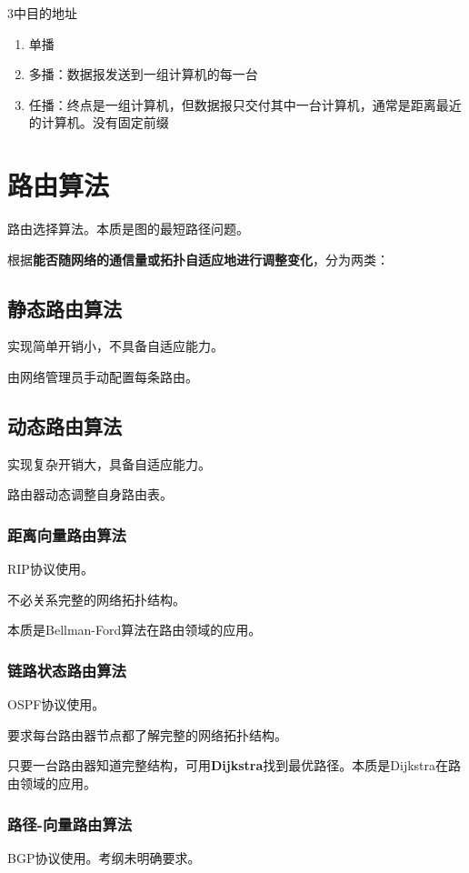 3中目的地址\begin{enumerate}
    \item 单播
    \item 多播：数据报发送到一组计算机的每一台
    \item 任播：终点是一组计算机，但数据报只交付其中一台计算机，通常是距离最近的计算机。没有固定前缀
\end{enumerate}


\section{路由算法}
路由选择算法。本质是图的最短路径问题。

根据\textbf{能否随网络的通信量或拓扑自适应地进行调整变化}，分为两类：

\subsection{静态路由算法}
实现简单开销小，不具备自适应能力。

由网络管理员手动配置每条路由。


\subsection{动态路由算法}
实现复杂开销大，具备自适应能力。

路由器动态调整自身路由表。

\subsubsection{距离向量路由算法}
RIP协议使用。

不必关系完整的网络拓扑结构。

本质是Bellman-Ford算法在路由领域的应用。


\subsubsection{链路状态路由算法}
OSPF协议使用。

要求每台路由器节点都了解完整的网络拓扑结构。

只要一台路由器知道完整结构，可用\textbf{Dijkstra}找到最优路径。本质是Dijkstra在路由领域的应用。


\subsubsection{路径-向量路由算法}
BGP协议使用。考纲未明确要求。


